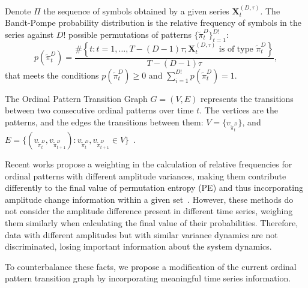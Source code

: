 \documentclass{isprs}
\begin{document}
	Denote $\Pi$ the sequence of symbols obtained by a given series $\mathbf{X}_t^{(D,\tau)}$.
	The Bandt-Pompe probability distribution is the relative frequency of symbols in the series against $D!$ possible permutations of patterns $\{\widetilde\pi_t^D \}_{t = 1}^{D!}$:
	\begin{equation}
	p(\widetilde\pi_t^D) = \frac{\#\left \{t : t = 1, \dots, T-(D-1)\tau; \mathbf{X}_t^{(D,\tau)} \text{ is of type } \widetilde\pi_t^D\right \}}{T- (D-1)\tau},  
	\end{equation}
	that meets the conditions $p(\widetilde\pi_t^D) \ge 0$ and  $\sum_{i=1}^{D!} p(\widetilde\pi_t^D) = 1$.
	
	The Ordinal Pattern Transition Graph ${G} = ({V}, {E})$ 
	represents the transitions between two consecutive ordinal patterns over time $t$.
	The vertices are the patterns, and the edges the transitions between them:
	$V = \{v_{\widetilde\pi_t^D}\}$, and 
	$E = \{(v_{\widetilde\pi_t^D}, v_{\widetilde\pi_{t+1}^D}): v_{\widetilde\pi_t^D}, v_{\widetilde\pi_{t+1}^D} \in V \}$~\cite{LearningandDistinguishingTimeSeriesDynamicsViaOrdinalPatternsTransitionGraphs2019}.
	
	
	Recent works propose a weighting in the calculation of relative frequencies for ordinal patterns with different amplitude variances, making them contribute differently to the final value of permutation entropy (PE) and thus incorporating amplitude change information within a given set~\cite{Fadlallah2013Weightedpermutation}.
	However, these methods do not consider the amplitude difference present in different time series, weighing them similarly when calculating the final value of their probabilities.
	Therefore, data with different amplitudes but with similar variance dynamics are not discriminated, losing important information about the system dynamics.
	
	To counterbalance these facts, we propose a modification of the current ordinal pattern transition graph by incorporating meaningful time series information.
	
\end{document}
